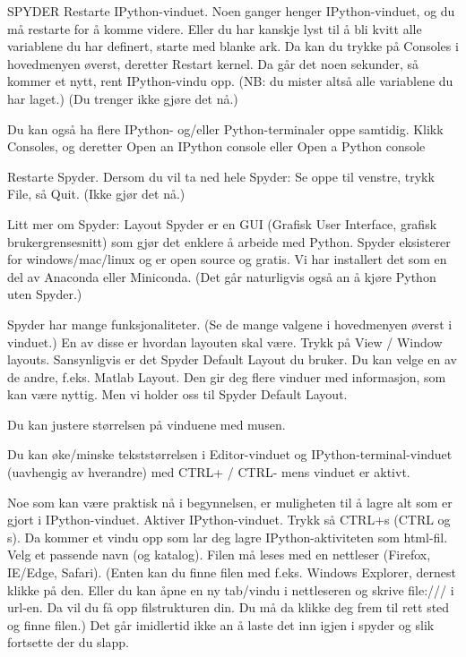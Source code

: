 SPYDER
Restarte IPython-vinduet.
Noen ganger henger IPython-vinduet, og du må restarte for å komme videre.
Eller du har kanskje lyst til å bli kvitt alle variablene du har definert,
starte med blanke ark. 
Da kan du trykke på Consoles i hovedmenyen øverst, deretter Restart kernel. 
Da går det noen sekunder, så kommer et nytt, rent IPython-vindu opp.
(NB: du mister altså alle variablene du har laget.) 
(Du trenger ikke gjøre det nå.)

Du kan også ha flere IPython- og/eller Python-terminaler oppe samtidig.
Klikk Consoles, og deretter 
Open an IPython console
eller 
Open a Python console


Restarte Spyder.
Dersom du vil ta ned hele Spyder: Se oppe til venstre, trykk File, så Quit. 
(Ikke gjør det nå.) 


Litt mer om Spyder: Layout 
Spyder er en GUI (Grafisk User Interface, grafisk brukergrensesnitt)
som gjør det enklere å arbeide med Python.
Spyder eksisterer for windows/mac/linux og er open source og gratis. 
Vi har installert det som en del av Anaconda eller Miniconda. 
(Det går naturligvis også an å kjøre Python uten Spyder.)


Spyder har mange funksjonaliteter.
(Se de mange valgene i hovedmenyen øverst i vinduet.)
En av disse er hvordan layouten skal være. 
Trykk på View / Window layouts.
Sansynligvis er det Spyder Default Layout du bruker.
Du kan velge en av de andre, f.eks. Matlab Layout.
Den gir deg flere vinduer med informasjon, som kan være nyttig.
Men vi holder oss til Spyder Default Layout.

Du kan justere størrelsen på vinduene med musen. 

Du kan øke/minske tekststørrelsen i Editor-vinduet og IPython-terminal-vinduet
(uavhengig av hverandre) med CTRL+ / CTRL- mens vinduet er aktivt. 

Noe som kan være praktisk nå i begynnelsen, er muligheten til å lagre alt
som er gjort i IPython-vinduet. 
Aktiver IPython-vinduet. Trykk så CTRL+s (CTRL og s).
Da kommer et vindu opp som lar deg lagre IPython-aktiviteten som html-fil.
Velg et passende navn (og katalog).
Filen må leses med en nettleser (Firefox, IE/Edge, Safari).
(Enten kan du finne filen med f.eks. Windows Explorer, dernest klikke på den. 
Eller du kan åpne en ny tab/vindu i nettleseren og skrive file:/// i url-en.
Da vil du få opp filstrukturen din. Du må da klikke deg frem til rett sted og finne filen.)
Det går imidlertid ikke an å laste det inn igjen i spyder og slik fortsette der du slapp. 


